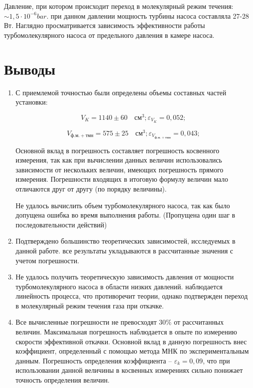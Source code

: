 \documentclass[12pt,a4paper]{article}
\begin{document}
	Давление, при котором происходит переход в молекулярный режим течения: $\sim 1,5 \cdot 10^{-6} bar$. при данном давлении мощность турбины насоса составляла 27-28 Вт. Наглядно просматривается зависимость эффективности работы турбомолекулярного насоса от предельного давления в камере насоса.
	
	
\section{Выводы}

\begin{enumerate}
	\item С приемлемой точностью были определены объемы составных частей установки:
	
	$$V_{K} = 1140 \pm 60 \quad \text{см}^3; \varepsilon_{V_{K}} = 0,052;$$
	
	$$V_{ф.м. + тмн} = 575 \pm 25 \quad \text{см}^3; \varepsilon_{V_{ф.м. + тмн}} = 0,043;$$
	
	Основной вклад в погрешность составляет погрешность косвенного измерения, так как при вычислении данных величин использовались зависимости от нескольких величин, имеющих погрешность прямого измерения. Погрешности входящих в итоговую формулу величин мало отличаются друг от другу (по порядку величины).
	
	Не удалось вычислить объем турбомолекулярного насоса, так как было допущена ошибка во время выполнения работы. (Пропущена один шаг в последовательности действий)
	
	\item Подтверждено большинство теоретических зависимостей, исследуемых в данной работе. все результаты укладываются в рассчитанные значения с учетом погрешности.
	
	\item Не удалось получить теоретическую зависимость давления от мощности турбомолекулярного насоса в области низких давлений. наблюдается линейность процесса, что противоречит теории, однако подтвержден переход в молекулярный режим течения газа при откачке.
	
	\item Все вычисленные погрешности не превосходят 30$\%$ от рассчитанных величин. Максимальная погрешность наблюдается в опыте по измерению скорости эффективной откачки. Основной вклад в данную погрешность внес коэффициент, определенный с помощью метода МНК по экспериментальным данным. Погрешность определения коэффициента -- $\varepsilon_{k} = 0,09$, что при использовании данной величины в косвенных измерениях сильно понижает точность определения величин.
\end{enumerate}
\end{document}
